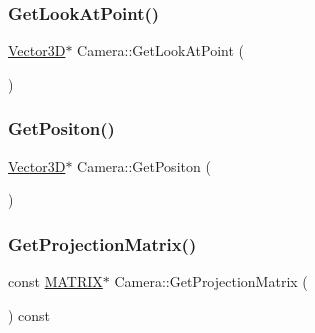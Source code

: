 \mbox{\label{class_camera_a4cc3e87e6522b4a1ae72eab5b87430a6}} 
\subsubsection{\texorpdfstring{Get\+Look\+At\+Point()}{GetLookAtPoint()}}
{\footnotesize\ttfamily \mbox{\hyperlink{class_vector3_d}{Vector3D}}$\ast$ Camera\+::\+Get\+Look\+At\+Point (\begin{DoxyParamCaption}{ }\end{DoxyParamCaption})\hspace{0.3cm}{\ttfamily [inline]}}

\mbox{\label{class_camera_a18f380bd6b2c42162c8fcf7e4441a355}} 
\subsubsection{\texorpdfstring{Get\+Positon()}{GetPositon()}}
{\footnotesize\ttfamily \mbox{\hyperlink{class_vector3_d}{Vector3D}}$\ast$ Camera\+::\+Get\+Positon (\begin{DoxyParamCaption}{ }\end{DoxyParamCaption})\hspace{0.3cm}{\ttfamily [inline]}}

\mbox{\label{class_camera_a473a7a8408bc7a1fdd46d12fa3852846}} 
\subsubsection{\texorpdfstring{Get\+Projection\+Matrix()}{GetProjectionMatrix()}}
{\footnotesize\ttfamily const \mbox{\hyperlink{_vector3_d_8h_a032295cd9fb1b711757c90667278e744}{M\+A\+T\+R\+IX}}$\ast$ Camera\+::\+Get\+Projection\+Matrix (\begin{DoxyParamCaption}{ }\end{DoxyParamCaption}) const\hspace{0.3cm}{\ttfamily [inline]}}

\mbox{\label{class_camera_aa767cb71ea435cee1e42effc912904eb}} 
